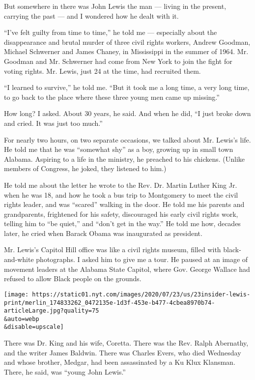 But somewhere in there was John Lewis the man --- living in the present,
carrying the past --- and I wondered how he dealt with it.

``I've felt guilty from time to time,'' he told me --- especially about
the disappearance and brutal murder of three civil rights workers,
Andrew Goodman, Michael Schwerner and James Chaney, in Mississippi in
the summer of 1964. Mr. Goodman and Mr. Schwerner had come from New York
to join the fight for voting rights. Mr. Lewis, just 24 at the time, had
recruited them.

``I learned to survive,'' he told me. ``But it took me a long time, a
very long time, to go back to the place where these three young men came
up missing.''

How long? I asked. About 30 years, he said. And when he did, ``I just
broke down and cried. It was just too much.''

For nearly two hours, on two separate occasions, we talked about Mr.
Lewis's life. He told me that he was ``somewhat shy'' as a boy, growing
up in small town Alabama. Aspiring to a life in the ministry, he
preached to his chickens. (Unlike members of Congress, he joked, they
listened to him.)

He told me about the letter he wrote to the Rev. Dr. Martin Luther King
Jr. when he was 18, and how he took a bus trip to Montgomery to meet the
civil rights leader, and was ``scared'' walking in the door. He told me
his parents and grandparents, frightened for his safety, discouraged his
early civil rights work, telling him to ``be quiet,'' and ``don't get in
the way.'' He told me how, decades later, he cried when Barack Obama was
inaugurated as president.

Mr. Lewis's Capitol Hill office was like a civil rights museum, filled
with black-and-white photographs. I asked him to give me a tour. He
paused at an image of movement leaders at the Alabama State Capitol,
where Gov. George Wallace had refused to allow Black people on the
grounds.

\texttt{[image: https://static01.nyt.com/images/2020/07/23/us/23insider-lewis-print/merlin\_174833262\_0472135e-1d3f-453e-b477-4cbea8970b74-articleLarge.jpg?quality=75\\\&auto=webp\\\&disable=upscale]}

There was Dr. King and his wife, Coretta. There was the Rev. Ralph
Abernathy, and the writer James Baldwin. There was Charles Evers, who
died Wednesday and whose brother, Medgar, had been assassinated by a Ku
Klux Klansman. There, he said, was ``young John Lewis.''

